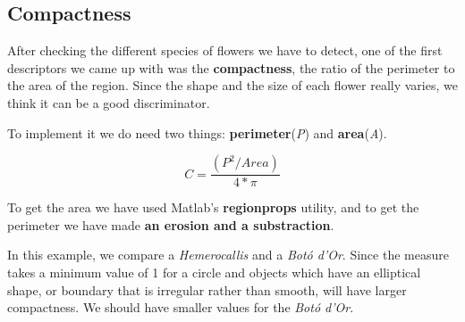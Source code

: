 \documentclass[11]{article}
\begin{document}
\subsection{Compactness}
After checking the different species of flowers we have to detect, one of the first descriptors we came up with was the \textbf{compactness}, the ratio of the perimeter to the area of the region. Since the shape and the size of each flower really varies, we think it can be a good discriminator. 
\medskip

To implement it we do need two things: \textbf{perimeter}(\textit{P}) and \textbf{area}(\textit{A}).

$$C= \frac{(P^2 / Area)} {4*\pi}$$
  \medskip
  
 To get the area we have used Matlab's \textbf{regionprops} utility, and to get the perimeter we have made \textbf{an erosion and a substraction}. 
 \medskip 
 
 \noindent In this example, we compare a \textit{Hemerocallis} and a \textit{Botó d'Or}. Since the measure takes a minimum value of 1 for a circle and objects which have an elliptical shape, or boundary that is irregular rather than smooth, will have larger compactness. We should have smaller values for the \textit{Botó d'Or}.
 
\end{document}
